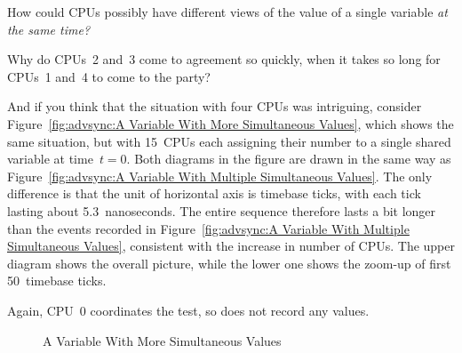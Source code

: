 \QuickQuiz{}
	How could CPUs possibly have different views of the
	value of a single variable \emph{at the same time?}
 \QuickQuizEnd

\QuickQuiz{}
	Why do CPUs~2 and~3 come to agreement so quickly, when it
	takes so long for CPUs~1 and~4 to come to the party?
 \QuickQuizEnd

And if you think that the situation with four CPUs was intriguing, consider
Figure~\ref{fig:advsync:A Variable With More Simultaneous Values},
which shows the same situation, but with 15~CPUs each assigning their
number to a single shared variable at time~$t=0$. Both diagrams in the
figure are drawn in the same way as 
Figure~\ref{fig:advsync:A Variable With Multiple Simultaneous Values}.
The only difference is that the unit of horizontal axis is timebase ticks,
with each tick lasting about 5.3~nanoseconds.
The entire sequence therefore lasts a bit longer than the events recorded in
Figure~\ref{fig:advsync:A Variable With Multiple Simultaneous Values},
consistent with the increase in number of CPUs.
The upper diagram shows the overall picture, while the lower one shows
the zoom-up of first 50~timebase ticks.

Again, CPU~0 coordinates the test, so does not record any values.

\begin{figure}
\centering
{}
\caption{A Variable With More Simultaneous Values}
\end{figure}

